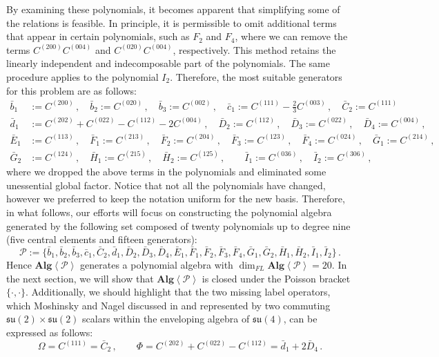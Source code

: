 \documentclass[10pt]{amsart}
\theoremstyle{definition}
\theoremstyle{corollary}
\theoremstyle{remark}
\theoremstyle{conclusion}
\begin{document}
By examining these polynomials, it becomes apparent that simplifying some of the relations is feasible. In principle, it is permissible to omit additional terms that appear in certain polynomials, such as $F_2$ and $F_4$, where we can remove the terms $C^{(200)}C^{(004)}$ and $C^{(020)}C^{(004)}$, respectively. This method retains the linearly independent and indecomposable part of the polynomials. The same procedure applies to the polynomial $I_2$. Therefore, the most suitable generators for this problem are as follows:
\begin{equation}
\begin{split}
\bar{b}_1&:=C^{(200)}  \, , \quad \bar{b}_2:=C^{(020)} \, , \quad \bar{b}_3:=C^{(002)} \, , \quad \bar{c}_1:=C^{(111)}-\frac{2}{3}C^{(003)} \, , \quad \bar{C}_2:=C^{(111)}\\
\bar{d}_1&:=C^{(202)}+C^{(022)}-C^{(112)}-2 C^{(004)} \, ,\quad \bar{D}_2:=C^{(112)} \, , \quad \bar{D}_3:=C^{(022)} \, ,\quad \bar{D}_4:=C^{(004)} \, , \\
 \bar{E}_1&:=C^{(113)} \, , \quad \bar{F}_1:=C^{(213)} \, , \quad \bar{F}_2:=C^{(204)}\, , \quad \bar{F}_3:=C^{(123)} \, , \quad \bar{F}_4:= C^{(024)} \, , \quad \bar{G}_1:=C^{(214)} \, , \\ \bar{G}_2&:=C^{(124)} \, , \quad \bar{H}_1:=C^{(215)} \, , \quad \bar{H}_2:=C^{(125)} \, ,\qquad \bar{I}_1:=C^{(036)} \, , \quad \bar{I}_2:=C^{(306)} \, ,
\end{split} \label{suitgene}
\end{equation}
where we dropped the above terms in the polynomials and eliminated some unessential global factor.   Notice that not all the polynomials have changed, however we preferred to keep the notation uniform for the new basis. Therefore, in what follows, our efforts will focus on constructing the polynomial algebra generated by the following set composed of twenty polynomials up to degree nine (five central elements and fifteen generators):
\begin{equation}
  \mathcal{P}:= \{\bar{b}_1, \bar{b}_2, \bar{b}_3, \bar{c}_1, \bar{C}_2, \bar{d}_1, \bar{D}_2, \bar{D}_3, \bar{D}_4, \bar{E}_1, \bar{F}_1, \bar{F}_2, \bar{F}_3, \bar{F}_4, \bar{G}_1, \bar{G}_2, \bar{H}_1, \bar{H}_2, \bar{I}_1, \bar{I}_2\} \, . 
\label{generatorspoly}
\end{equation} Hence $\textbf{Alg} \left\langle \mathcal{P} \right\rangle $ generates a polynomial algebra with $\dim_{FL} \textbf{Alg} \left\langle \mathcal{P} \right\rangle = 20.$ In the next section, we will show that $\textbf{Alg} \left\langle \mathcal{P} \right\rangle$ is closed under the Poisson bracket $\{\cdot,\cdot\}.$ Additionally, we should highlight that the two missing label operators, which Moshinsky and Nagel discussed in \cite{MR189602} and represented by two commuting $\mathfrak{su}(2) \times \mathfrak{su}(2)$ scalars within the enveloping algebra of $\mathfrak{su}(4)$, can be expressed as follows:
\begin{equation}
\Omega=C^{(111)} =\bar{C}_2\, , \qquad \Phi=C^{(202)}+C^{(022)}-C^{(112)}=\bar{d}_1+2\bar{D}_4 \, .
\end{equation}
\end{document}
